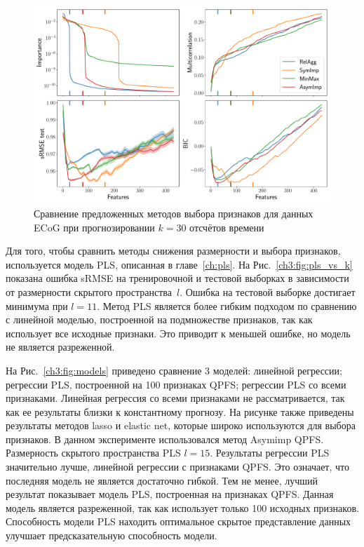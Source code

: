 \documentclass[11pt, a5paper]{dissert}
\begin{document}
\begin{figure}[ht]
	\includegraphics[width=\linewidth]{figs/ch3/ecog_3_30_metrics}
	\caption{Сравнение предложенных методов выбора признаков для данных ECoG при прогнозировании $k = 30$ отсчётов времени}
	\label{ch3:fig:ecog_3_30_metrics}
\end{figure}

Для того, чтобы сравнить методы снижения размерности и выбора признаков, используется модель PLS, описанная в главе~\ref{ch:pls}. 
На Рис.~\ref{ch3:fig:pls_vs_k} показана ошибка sRMSE на тренировочной и тестовой выборках в зависимости от размерности скрытого пространства~$l$.
Ошибка на тестовой выборке достигает минимума при $l = 11$.
Метод PLS является более гибким подходом по сравнению с линейной моделью, построенной на подмножестве признаков, так как использует все исходные признаки.
Это приводит к меньшей ошибке, но модель не является разреженной.

На Рис.~\ref{ch3:fig:models} приведено сравнение 3 моделей: линейной регрессии; регрессии PLS, построенной на 100 признаках QPFS; регрессии PLS со всеми признаками.
Линейная регрессия со всеми признаками не рассматривается, так как ее результаты близки к константному прогнозу. На рисунке также приведены результаты методов lasso и elastic net, которые широко используются для выбора признаков.
В данном эксперименте использовался метод Asymimp QPFS.
Размерность скрытого пространства PLS $l = 15$.
Результаты регрессии PLS значительно лучше, линейной регрессии с признаками QPFS.
Это означает, что последняя модель не является достаточно гибкой.
Тем не менее, лучший результат показывает модель PLS, построенная на признаках QPFS. 
Данная модель является разреженной, так как использует только 100 исходных признаков.
Способность модели PLS находить оптимальное скрытое представление данных улучшает предсказательную способность модели.
\end{document}
